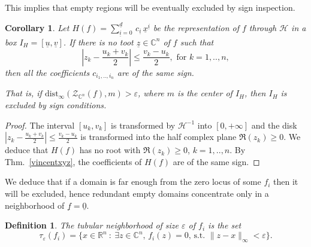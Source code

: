 \documentclass{sig-alternate}
\newtheorem{corollary}[theorem]{Corollary}
\newtheorem{definition}[theorem]{Definition}\newtheorem{dxample}[theorem]{Example}
\newcommand{\ds}{\displaystyle}
\newcommand{\dott}{{..}}
\def\CC{{\mathbb C}} \def\NN{{\mathbb N}} \def\PP{{\mathbb P}}
\def\RR{\mathbb{R}}
\newcommand{\uvec}[1]{\underline{#1}}
\begin{document}
This implies that empty regions will be eventually excluded by sign inspection.

\begin{corollary} \label{corxyz}
  Let $H(f) = \sum_{\uvec i=0}^{\uvec d} \, c_{\uvec i} \, \uvec x^{\uvec i}$
  be the representation of $f$ through $\mathcal H$ in a box $I_H=[\uvec u,
    \uvec v]$. If
  there is no toot $\uvec z\in\CC^n$ of $f$ such that  
  \[ \left|z_k - \frac{u_k + v_k}{2} \right| \le \frac{v_k-u_k}{2},
  \text{ for } k = 1, \dott, n, \] then all the coefficients $c_{i_1,
    \dott, i_n}$ are of the same sign.

That is, if $\ds \text{dist}_{\infty}({\mathcal Z}_{\CC^{n}}(f), m)>\varepsilon$,
where $m$ is the center of $I_H$, then $I_H$ is excluded by sign conditions. 
\end{corollary}
\begin{proof}
  The interval $[u_k,v_k]$ is transformed by $\mathcal H^{-1}$ into
  $[0,+\infty]$ and the disk $\left|z_k - \frac{u_k + v_k}{2} \right|
  \le \frac{v_k-u_k}{2}$ is transformed into the half complex plane
  $\Re(z_k)\geq 0$.  We deduce that $H(f)$ has no root with $\Re
  (z_k) \ge 0$, $k = 1, \dott, n$.  By Thm.~\ref{vincentxyz}, the
  coefficients of $H(f)$ are of the same sign.
\end{proof}

We deduce that if a domain is far enough from the zero locus of
some $f_i$ then it will be excluded, hence redundant empty domains
concentrate only in a neighborhood of $\uvec f=\uvec 0$.

\begin{definition}
The tubular neighborhood of size $\varepsilon$ of $f_i$ is the set 
$$
{\tau}_\varepsilon(f_i)=\{x\in\RR^n\ :\ \exists z\in\CC^{n},\, f_i(z)=0,\,\text{s.t. } \|z-x\|_\infty <\varepsilon\}  .  
$$
\end{definition}
\end{document}
